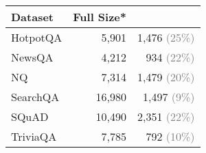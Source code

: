 


\small
\begin{tabular}{lrr}
        \toprule
        \textbf{Dataset} & \textbf{Full Size*} & \textbf{\dataset{}} \\
        \midrule
        HotpotQA  & 5,901  & 1,476 {\footnotesize \textcolor{gray}{(25\%)}}  \\
        NewsQA    & 4,212  & 934  {\footnotesize \textcolor{gray}{(22\%)}}  \\
        NQ        & 7,314  & 1,479 {\footnotesize \textcolor{gray}{(20\%)}}  \\
        SearchQA  & 16,980  & 1,497 {\footnotesize \textcolor{gray}{(9\%)}}  \\
        SQuAD     & 10,490  & 2,351 {\footnotesize \textcolor{gray}{(22\%)}}  \\
        TriviaQA  & 7,785  & 792  {\footnotesize \textcolor{gray}{(10\%)}}  \\
        \bottomrule
    \end{tabular}



